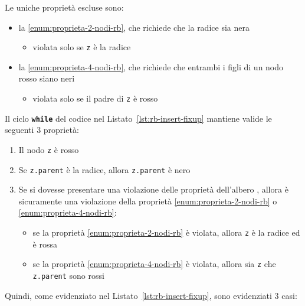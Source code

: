 \documentclass[italian, 10pt]{article}
\begin{document}
Le uniche proprietà escluse sono:

\begin{itemize}
  \item la \ref{enum:proprieta-2-nodi-rb}, che richiede che la radice sia nera
        \begin{itemize}
          \item violata solo se \texttt{z} è la radice
        \end{itemize}
  \item la \ref{enum:proprieta-4-nodi-rb}, che richiede che entrambi i figli di un nodo rosso siano neri
        \begin{itemize}
          \item violata solo se il padre di \texttt{z} è rosso
        \end{itemize}
\end{itemize}

\bigskip
Il ciclo \textbf{\texttt{while}} del codice nel Listato~\ref{lst:rb-insert-fixup} mantiene valide le seguenti \(3\) proprietà:

\begin{enumerate}
  \item Il nodo \texttt{z} è rosso
  \item Se \texttt{z.parent} è la radice, allora \texttt{z.parent} è nero
  \item Se si dovesse presentare una violazione delle proprietà dell'albero \RB, allora è sicuramente una violazione della proprietà \ref{enum:proprieta-2-nodi-rb} o \ref{enum:proprieta-4-nodi-rb}:
        \begin{itemize}
          \item se la proprietà \ref{enum:proprieta-2-nodi-rb} è violata, allora \texttt{z} è la radice ed è rossa
          \item se la proprietà \ref{enum:proprieta-4-nodi-rb} è violata, allora sia \texttt{z} che \texttt{z.parent} sono rossi
        \end{itemize}
\end{enumerate}

Quindi, come evidenziato nel Listato~\ref{lst:rb-insert-fixup}, sono evidenziati \(3\) casi:
\end{document}
